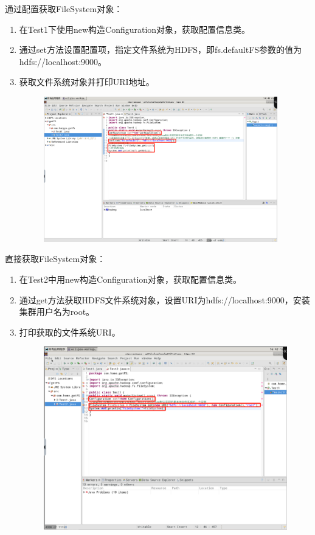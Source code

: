 \documentclass {article}
\begin{document}
				通过配置获取FileSystem对象：
				\begin{enumerate}
					\item 在Test1下使用new构造Configuration对象，获取配置信息类。
					\item 通过set方法设置配置项，指定文件系统为HDFS，即fs.defaultFS参数的值为hdfs://localhost:9000。
					\item 获取文件系统对象并打印URI地址。
					\begin{figure}[H]
						\centering
						\includegraphics[width=4in]{figures/fig16.png}
					\end{figure}
				\end{enumerate}
			
				直接获取FileSystem对象：
				\begin{enumerate}
					\item 在Test2中用new构造Configuration对象，获取配置信息类。
					\item 通过get方法获取HDFS文件系统对象，设置URI为hdfs://localhost:9000，安装集群用户名为root。
					\item 打印获取的文件系统URI。
					\begin{figure}[H]
						\centering
						\includegraphics[width=4.5in]{figures/fig16.5.png}
					\end{figure}
				\end{enumerate}
			
\end{document}

